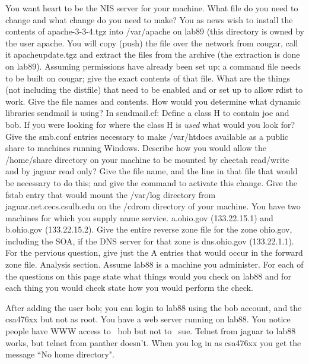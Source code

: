 \ques
You want {\ltt{}heart} to be the NIS server for your machine.
What file do you need to change and what change do
you need to make?
\vskip 1.0in
\ques
You as {\ltt{}news} wish to install the contents
of {\ltt{}apache-3-3-4.tgz}
into {\ltt{}/var/apache} on {\ltt{}lab89}
(this directory is owned by the user {\ltt{}apache}.
You will copy (push) the file over the network from {\ltt{}cougar},
call it {\ltt{}apacheupdate.tgz} and extract the files from
the archive (the extraction is done on {\ltt{}lab89}).
Assuming permissions have already been set up;
a command file needs to be built on {\ltt{}cougar};
give the exact contents of that file.
\vskip 1.0in
\vfill\eject
\ques
What are the things (not including the distfile) that need to be
enabled and or set up to allow {\ltt{}rdist} to work.
Give the file names and contents.
\vskip 1.3in
\ques
How would you determine what dynamic libraries {\ltt{}sendmail} is using?
\vskip 0.5in
\ques
In {\ltt{}sendmail.cf}:
Define a class {\ltt{}H} to contain {\ltt{}joe} and {\ltt{}bob}. 
If you were looking for where the class H is {\it used} what would you look for?
\vskip 1.5in
\ques
Give the {\ltt{}smb.conf} entries necessary to make
{\ltt{}/var/htdocs} available as a public share to
machines running Windows.
\vskip 1.5in
\vfill\eject
\ques
Describe how you would allow
the {\ltt{}/home/share} directory on your machine to be mounted
by {\ltt{}cheetah} read/write
and by {\ltt{}jaguar} read only?
Give the file name, and the line in that file that would be
necessary to do this; and give the command to activate this change.
\vskip 1.0in
\ques
Give the {\ltt{}fstab} entry that would mount
the {\ltt{}/var/log} directory from {\ltt{}jaguar.net.cecs.csulb.edu}
on the {\ltt{}/cdrom} directory of your machine.
\vskip 0.8in
\ques
You have two machines for which you supply name service.
{\ltt{}a.ohio.gov} (133.22.15.1) and 
{\ltt{}b.ohio.gov} (133.22.15.2).
Give the entire reverse zone file for the zone {\ltt{}ohio.gov},
including the SOA, if the DNS server for that zone
is {\ltt{}dns.ohio.gov} ({\ltt{}133.22.1.1}).
\vskip 4.2in
\ques
For the pervious question, give just the {\ltt{}A} entries
that would occur in the forward zone file.
\vfill\eject
Analysis section. Assume {\ltt{}lab88} is a machine you administer.
For each of the questions on this page
state what things would you check on {\ltt{}lab88}
and for each thing you would check state how you would perform the check.

\ques
After adding the user bob;
you can login to {\ltt{}lab88} using the
{\ltt{}bob} account, and the {\ltt{}csa476xx} but not as {\ltt{}root}.
\vfill
\ques
You have a web server running on {\ltt{}lab88}.
You notice people have WWW access to {\ltt{}~bob} but not to {\ltt{}~sue}.
\vfill
\ques
Telnet from {\ltt{}jaguar} to {\ltt{}lab88} works, but
telnet from {\ltt{}panther} doesn't.
\vfill
\ques
When you log in as {\ltt{}csa476xx} you get the message
``No home directory".
\bye
